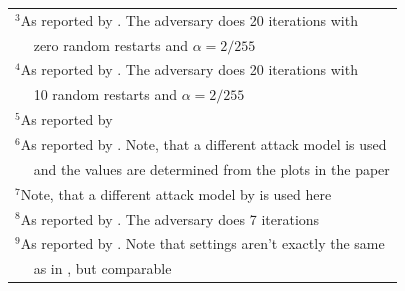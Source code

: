 \documentclass[conference]{IEEEtran}
\begin{document}
\begin{table}[!htbp]
\begin{center}
{\begin{tabular}{|c|c|c|c|c|}
  \multicolumn{5}{l}{$^{\mathrm{3}}$As reported by \cite{b28}. The adversary does 20 iterations with} \\
  \multicolumn{5}{l}{$\quad$ zero random restarts and $\alpha=2/255$} \\
  \multicolumn{5}{l}{$^{\mathrm{4}}$As reported by \cite{b5}. The adversary does 20 iterations with} \\
  \multicolumn{5}{l}{$\quad$ 10 random restarts and $\alpha=2/255$} \\
  \multicolumn{5}{l}{$^{\mathrm{5}}$As reported by \cite{b1}} \\
  \multicolumn{5}{l}{$^{\mathrm{6}}$As reported by \cite{b15}. Note, that a different attack model is used} \\
  \multicolumn{5}{l}{$\quad$ and the values are determined from the plots in the paper} \\
  \multicolumn{5}{l}{$^{\mathrm{7}}$Note, that a different attack model by \cite{b10} is used here} \\
  \multicolumn{5}{l}{$^{\mathrm{8}}$As reported by \cite{b11}. The adversary does 7 iterations} \\
  \multicolumn{5}{l}{$^{\mathrm{9}}$As reported by \cite{b4}. Note that settings aren't exactly the same} \\ 
  \multicolumn{5}{l}{$\quad$ as in \cite{b11}, but comparable}
  \label{tab:modeleval}
  \end{tabular}
  }
  \label{tab1}
  \end{center}
\end{table}
\vspace*{-0.3cm}
\end{document}

